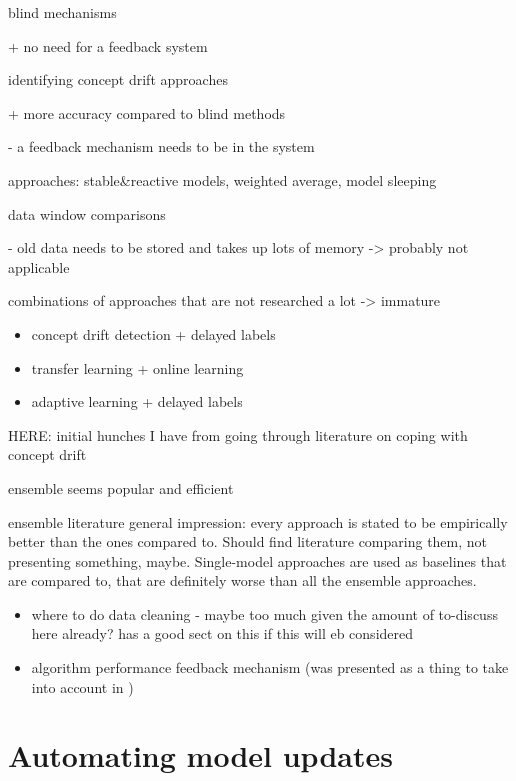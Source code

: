 blind mechanisms

+ no need for a feedback system

identifying concept drift approaches

+ more accuracy compared to blind methods \cite{conceptdriftsurvey}

- a feedback mechanism needs to be in the system





approaches: stable&reactive models, weighted average, model sleeping \cite{conceptdriftsurvey}

data window comparisons

- old data needs to be stored and takes up lots of memory \cite{conceptdriftsurvey} -> probably not applicable

combinations of approaches that are not researched a lot -> immature

\begin{itemize}
    \item concept drift detection + delayed labels \cite{mlforstreamingsurvey}
    \item transfer learning + online learning \cite{mlforstreamingsurvey}
    \item adaptive learning + delayed labels \cite{mlforstreamingsurvey}
\end{itemize}

HERE: initial hunches I have from going through literature on coping with concept drift

ensemble seems popular and efficient

ensemble literature general impression: every approach is stated to be empirically better than the ones compared to. Should find literature comparing them, not presenting something, maybe. Single-model approaches are used as baselines that are compared to, that are definitely worse than all the ensemble approaches.



\begin{itemize}
    \item where to do data cleaning - maybe too much given the amount of to-discuss here already? \cite{mlforstreamingsurvey} has a good sect on this if this will eb considered
    \item algorithm performance feedback mechanism (was presented as a thing to take into account in \cite{streamminingchallenges})
\end{itemize}

\section{Automating model updates}

